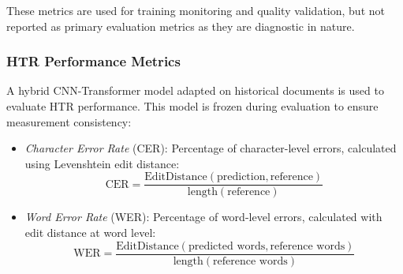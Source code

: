 \documentclass[journal]{IEEEtran}
\begin{document}
These metrics are used for training monitoring and quality validation, but not reported as primary evaluation metrics as they are diagnostic in nature.

\subsubsection{HTR Performance Metrics}

A hybrid CNN-Transformer model adapted on historical documents is used to evaluate HTR performance. This model is frozen during evaluation to ensure measurement consistency:

\begin{itemize}
    \item \textit{Character Error Rate} (CER): Percentage of character-level errors, calculated using Levenshtein edit distance:
    \begin{equation}
    \text{CER} = \frac{\text{EditDistance}(\text{prediction}, \text{reference})}{\text{length}(\text{reference})}
    \end{equation}
    
    \item \textit{Word Error Rate} (WER): Percentage of word-level errors, calculated with edit distance at word level:
    \begin{equation}
    \text{WER} = \frac{\text{EditDistance}(\text{predicted words}, \text{reference words})}{\text{length}(\text{reference words})}
    \end{equation}
\end{itemize}
\end{document}
